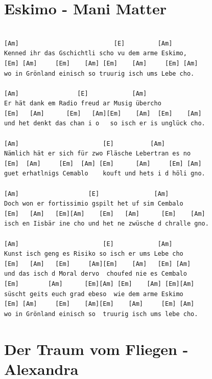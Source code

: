 \documentclass[]{book}
\let\stdsection\section
\renewcommand\section{\clearpage\stdsection}
\begin{document}
\hypertarget{eskimo---mani-matter}{%
\section{Eskimo - Mani Matter}\label{eskimo---mani-matter}}

\begin{verbatim}

[Am]                          [E]         [Am]
Kenned ihr das Gschichtli scho vu dem arme Eskimo,
[Em] [Am]     [Em]    [Am] [Em]    [Am]     [Em] [Am]
wo in Grönland einisch so truurig isch ums Lebe cho.

[Am]                [E]            [Am]
Er hät dank em Radio freud ar Musig übercho
[Em]   [Am]      [Em]   [Am][Em]    [Am]  [Em]    [Am]
und het denkt das chan i o   so isch er is unglück cho.

[Am]                       [E]          [Am]
Nämlich hät er sich für zwo Fläsche Lebertran es no
[Em]  [Am]     [Em]  [Am] [Em]      [Am]     [Em] [Am]
guet erhatlnigs Cemablo    kouft und hets i d höli gno.

[Am]                   [E]               [Am]
Doch won er fortissimio gspilt het uf sim Cembalo
[Em]   [Am]   [Em][Am]    [Em]   [Am]      [Em]    [Am]
isch en Iisbär ine cho und het ne zwüsche d chralle gno.

[Am]                       [E]            [Am]
Kunst isch geng es Risiko so isch er ums Lebe cho
[Em]   [Am]   [Em]     [Am][Em]    [Am]   [Em] [Am]
und das isch d Moral dervo  choufed nie es Cembalo
[Em]        [Am]      [Em][Am] [Em]    [Am] [Em][Am]
süscht geits euch grad ebeso  wie dem arme Eskimo
[Em] [Am]     [Em]    [Am][Em]    [Am]     [Em] [Am]
wo in Grönland einisch so  truurig isch ums lebe cho.

\end{verbatim}

\hypertarget{der-traum-vom-fliegen---alexandra}{%
\section{Der Traum vom Fliegen - Alexandra}\label{der-traum-vom-fliegen---alexandra}}
\end{document}
